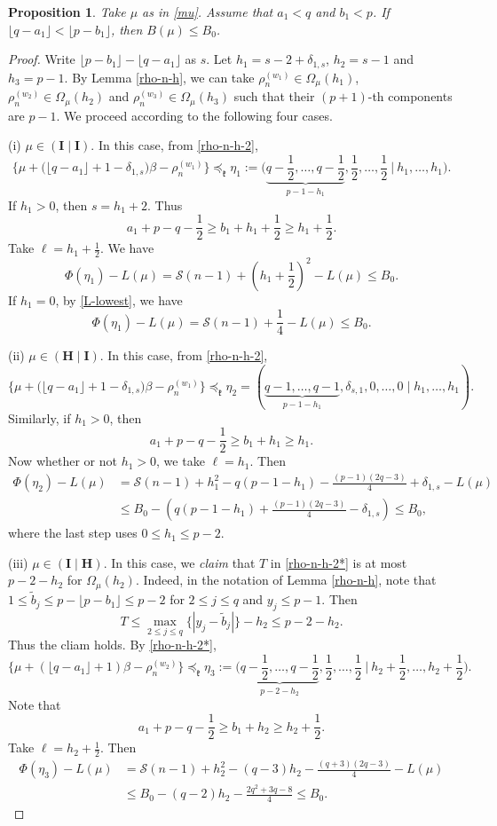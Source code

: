 \documentclass[11pt]{amsart}
\theoremstyle{plain}
\newtheorem{prop}[thm]{Proposition}
\theoremstyle{definition}
\newcommand{\mfk}{\mathfrak{k}}
\newcommand{\caS}{\mathcal{S}}
\begin{document}
\begin{prop}\label{pro-2}
	Take $\mu$ as in \eqref{mu}. Assume that $a_1<q$ and $b_1<p$. If $\lfloor q-a_1\rfloor<\lfloor p-b_1\rfloor$, then $B(\mu)\le B_0$.
\end{prop}
\begin{proof}
	Write $\lfloor p-b_1\rfloor-\lfloor q-a_1\rfloor$ as $s$. Let $h_1=s-2+\delta_{1,s}$, $h_2=s-1$ and $h_3=p-1$. By Lemma \ref{rho-n-h}, we can take $\rho_n^{(w_1)}\in \Omega_{\mu}(h_1)$, $\rho_n^{(w_2)}\in \Omega_{\mu}(h_2)$ and $\rho_n^{(w_3)}\in \Omega_{\mu}(h_3)$ such that their $(p+1)$-th components are $p-1$. We proceed according to  the following four cases.

	(i) $\mu\in (\textbf{I}\mid \textbf{I})$. In this case,  from \eqref{rho-n-h-2},
		\[\{\mu+\big(\lfloor q-a_1\rfloor+1-\delta_{1,s}\big)\beta-\rho_n^{(w_{1})}\}\preceq_\mfk\eta_1:=\bigg(\underbrace{q-\frac{1}{2},\dots,q-\frac{1}{2}}_{p-1-h_1},\dfrac{1}{2},\dots,\dfrac{1}{2}\ \bigg|\ h_1,\dots,h_1\bigg).\]
		If $h_1>0$, then $s=h_1+2$. Thus
		\[a_1+p-q-\frac{1}{2}\ge b_1+h_1+\frac{1}{2}\ge h_1+\frac{1}{2}.\]
		Take $\ell=h_1+\frac{1}{2}$. We have
		\[\Phi(\eta_1)-L(\mu)=\caS(n-1)+\left(h_1+\frac{1}{2}\right)^2-L(\mu)\le B_0.\]
		If $h_1=0$, by \eqref{L-lowest}, we have
		\[\Phi(\eta_1)-L(\mu)=\caS(n-1)+\frac{1}{4}-L(\mu)\le B_0.\]
		
		
		(ii) $\mu\in(\textbf{H}\mid \textbf{I})$. In this case, from \eqref{rho-n-h-2},
		\[\{\mu+\big(\lfloor q-a_1\rfloor+1-\delta_{1,s}\big)\beta-\rho_n^{(w_{1})}\}\preceq_\mfk\eta_2=(\underbrace{q-1,\dots,q-1}_{p-1-h_1},\delta_{s,1},0,\dots,0\mid h_1,\dots,h_1).\]
		Similarly, if $h_1>0$, then
			\[a_1+p-q-\frac{1}{2}\ge b_1+h_1\ge h_1.\]
		Now whether or not $h_1>0$, we take $\ell=h_1$. Then
		\begin{align*}
			\Phi(\eta_2)-L(\mu)&= \caS(n-1)+h_1^2-q(p-1-h_1)-\frac{(p-1)(2q-3)}{4}+\delta_{1,s}-L(\mu)\\
			&\le B_0-\left(q(p-1-h_1)+\frac{(p-1)(2q-3)}{4}-\delta_{1,s}\right)\le B_0,
		\end{align*}
		where the last step uses $0\le h_1\le p-2$.
		
		(iii) $\mu\in (\textbf{I}\mid \textbf{H})$. In this case, we \emph{claim} that $T$ in \eqref{rho-n-h-2*} is at most $p-2-h_2$ for $\Omega_{\mu}(h_2)$. Indeed, in the notation of Lemma \ref{rho-n-h}, note that $1\le \widetilde{b}_j\le p-\lfloor p-b_1\rfloor\le p-2$ for $2\le j\le q$ and $y_j\le p-1$. Then
		\[T\le \max_{2\le j\le q}\{|y_j-\widetilde{b}_j|\}-h_2\le p-2-h_2.\]
		Thus the cliam holds. By \eqref{rho-n-h-2*},
		\[\{\mu+(\lfloor q-a_1\rfloor+1)\beta-\rho_n^{(w_{2})}\}\preceq_\mfk\eta_3:=\bigg(\underbrace{q-\frac{1}{2},\dots,q-\frac{1}{2}}_{p-2-h_2},\dfrac{1}{2},\dots,\dfrac{1}{2}\ \bigg|\ h_2+\dfrac{1}{2},\dots,h_2+\dfrac{1}{2}\bigg).\]
		Note that
		\[a_1+p-q-\frac{1}{2}\ge b_1+h_2\ge h_2+\frac{1}{2}.\]
		Take $\ell=h_2+\frac{1}{2}$. Then
		\begin{align*}
			\Phi(\eta_3)-L(\mu)&= \caS(n-1)+h_2^2-(q-3)h_2-\frac{(q+3)(2q-3)}{4}-L(\mu)\\
			&\le B_0-(q-2)h_2-\frac{2q^2+3q-8}{4}\le B_0.
		\end{align*}
		

\end{proof}
\end{document}
